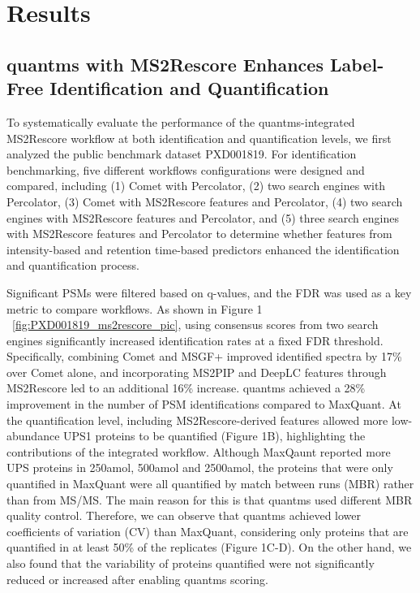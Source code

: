 \documentclass[12pt]{article}
\begin{document}
\section{Results}

\subsection{quantms with MS2Rescore Enhances Label-Free Identification and Quantification}
To systematically evaluate the performance of the quantms-integrated MS2Rescore workflow at both identification and quantification levels, we first analyzed the public benchmark dataset PXD001819. For identification benchmarking, five different workflows configurations were designed and compared, including (1) Comet with Percolator, (2) two search engines with Percolator, (3) Comet with MS2Rescore features and Percolator, (4) two search engines with MS2Rescore features and Percolator, and (5) three search engines with MS2Rescore features and Percolator to determine whether features from intensity-based and retention time-based predictors enhanced the identification and quantification process.

Significant PSMs were filtered based on q-values, and the FDR was used as a key metric to compare workflows. As shown in Figure 1 ~\ref{fig:PXD001819_ms2rescore_pic}, using consensus scores from two search engines significantly increased identification rates at a fixed FDR threshold. Specifically, combining Comet and MSGF+ improved identified spectra by 17\% over Comet alone, and incorporating MS2PIP and DeepLC features through MS2Rescore led to an additional 16\% increase. quantms achieved a 28\% improvement in the number of PSM identifications compared to MaxQuant. At the quantification level, including MS2Rescore-derived features allowed more low-abundance UPS1 proteins to be quantified (Figure 1B), highlighting the contributions of the integrated workflow. Although MaxQaunt reported more UPS proteins in 250amol, 500amol and 2500amol, the proteins that were only quantified in MaxQuant were all quantified by match between runs (MBR) rather than from MS/MS. The main reason for this is that quantms used different MBR quality control. Therefore, we can observe that quantms achieved lower coefficients of variation (CV) than MaxQuant, considering only proteins that are quantified in at least 50\% of the replicates (Figure 1C-D). On the other hand, we also found that the variability of proteins quantified were not significantly reduced or increased after enabling quantms  scoring.
\end{document}

